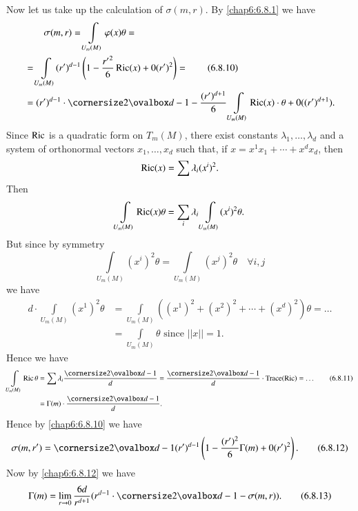 Now let us take up the calculation of $\sigma(m,r)$. By \eqref{chap6:6.8.1}
we have
\begin{align*}
&\qquad \sigma(m,r)=\int\limits_{U_{m}(M)}\varphi(x)\theta=\\
&=
  \int\limits_{U_{m}(M)}(r')^{d-1}\left(1-\frac{{r'}^{2}}{6}\Ric(x)+0(r')^{2}\right)=\tag{6.8.10}\label{chap6:6.8.10}\\
&= (r')^{d-1}\cdot
  \oval{d-1}-\frac{(r')^{d+1}}{6}\int\limits_{U_{m}(M)}\Ric(x)\cdot \theta+0((r')^{d+1}).
\end{align*}
Since \pageoriginale $\operatorname{Ric}$ is a quadratic form on $T_{m}(M)$, there
exist constants $\lambda_{1},\ldots,\lambda_{d}$ and a system of
orthonormal vectors $x_{1},\ldots,x_{d}$ such that, if
$x=x^{1}x_{1}+\cdots+x^{d}x_{d}$, then
$$
\operatorname{Ric}(x)=\sum\lambda_{i}(x^{i})^{2}.
$$
Then
$$
\int\limits_{U_{m}(M)}\operatorname{Ric}(x)\theta=\sum_{i}\lambda_{i}\int\limits_{U_{m}(M)}(x^{i})^{2}\theta. 
$$
But since by symmetry
$$
\int\limits_{U_{m}(M)}(x^{i})^{2}\theta=\int\limits_{U_{m}(M)}(x^{j})^{2}\theta\quad\forall
i,j
$$
we have
\begin{align*}
d\cdot \int\limits_{U_{m}(M)}(x^{1})^{2}\theta &=
\int\limits_{U_{m}(M)}((x^{1})^{2}+(x^{2})^{2}+\cdots+(x^{d})^{2})\theta=\ldots\\
&= \int\limits_{U_{m}(M)}\theta\text{ \  since \ }||x||=1.
\end{align*}
Hence we have
\begin{align*}
\int\limits_{U_{m}(M)}\Ric\theta&=
\sum\lambda_{i}\frac{\oval{d-1}}{d}=\frac{\oval{d-1}}{d}\cdot
\Trace(\Ric)=\ldots\tag{6.8.11}\label{chap6:6.8.11}\\
&= \Gamma(m)\cdot \frac{\oval{d-1}}{d}.
\end{align*}
Hence by \eqref{chap6:6.8.10} we have
\begin{equation*}
\sigma(m,r')=\oval{d-1}(r')^{d-1}\left(1-\frac{(r')^{2}}{6}\Gamma(m)+0(r')^{2}\right).\tag{6.8.12}\label{chap6:6.8.12}
\end{equation*}
Now by \eqref{chap6:6.8.12} we have
\begin{equation*}
\Gamma(m)=\lim\limits_{r\to 0}\frac{6d}{r^{d+1}}(r^{d-1}\cdot
\oval{d-1}-\sigma(m,r)).\tag{6.8.13}\label{chap6:6.8.13} 
\end{equation*}

\setcounter{subsection}{13}

\subsection{}\label{chap6:6.8.14}


